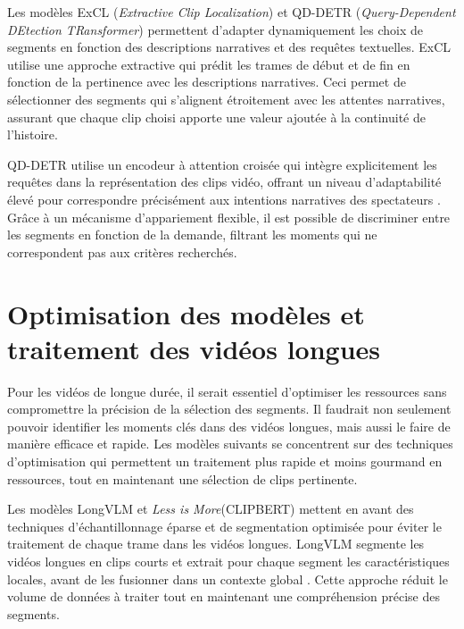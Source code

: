 \documentclass[livre]{udes-genie-these}
\begin{document}
Les modèles ExCL (\textit{Extractive Clip Localization}) \cite{ghosh2019_excl} et QD-DETR (\textit{Query-Dependent DEtection TRansformer}) \cite{sun2023_gptsee} permettent d’adapter dynamiquement les choix de segments en fonction des descriptions narratives et des requêtes textuelles. ExCL utilise une approche extractive qui prédit les trames de début et de fin en fonction de la pertinence avec les descriptions narratives. Ceci permet de sélectionner des segments qui s’alignent étroitement avec les attentes narratives, assurant que chaque clip choisi apporte une valeur ajoutée à la continuité de l’histoire. 

QD-DETR utilise un encodeur à attention croisée qui intègre explicitement les requêtes dans la représentation des clips vidéo, offrant un niveau d’adaptabilité élevé pour correspondre précisément aux intentions narratives des spectateurs \cite{lei2021_moments}. Grâce à un mécanisme d’appariement flexible, il est possible de discriminer entre les segments en fonction de la demande, filtrant les moments qui ne correspondent pas aux critères recherchés.

\section{Optimisation des modèles et traitement des vidéos longues}

Pour les vidéos de longue durée, il serait essentiel d’optimiser les ressources sans compromettre la précision de la sélection des segments. Il faudrait non seulement pouvoir identifier les moments clés dans des vidéos longues, mais aussi le faire de manière efficace et rapide. Les modèles suivants se concentrent sur des techniques d’optimisation qui permettent un traitement plus rapide et moins gourmand en ressources, tout en maintenant une sélection de clips pertinente. 

Les modèles LongVLM \cite{weng2024} et \textit{Less is More}(CLIPBERT) \cite{lei2021_clipbert} mettent en avant des techniques d’échantillonnage éparse et de segmentation optimisée pour éviter le traitement de chaque trame dans les vidéos longues. LongVLM segmente les vidéos longues en clips courts et extrait pour chaque segment les caractéristiques locales, avant de les fusionner dans un contexte global \cite{weng2024}. Cette approche réduit le volume de données à traiter tout en maintenant une compréhension précise des segments. 
\end{document}
